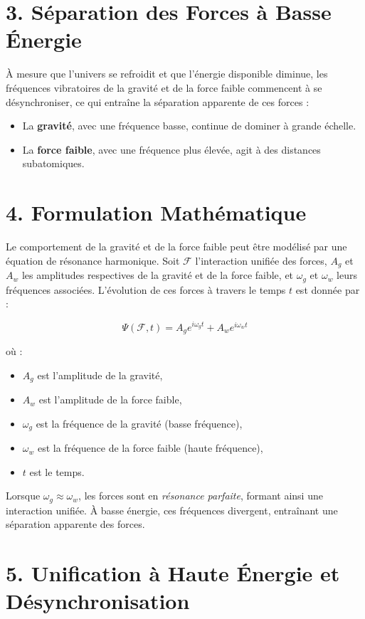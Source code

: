 \documentclass{article}
\begin{document}
\section{3. Séparation des Forces à Basse Énergie}

À mesure que l'univers se refroidit et que l'énergie disponible diminue, les fréquences vibratoires de la gravité et de la force faible commencent à se désynchroniser, ce qui entraîne la séparation apparente de ces forces :
\begin{itemize}
    \item La \textbf{gravité}, avec une fréquence basse, continue de dominer à grande échelle.
    \item La \textbf{force faible}, avec une fréquence plus élevée, agit à des distances subatomiques.
\end{itemize}

\section{4. Formulation Mathématique}

Le comportement de la gravité et de la force faible peut être modélisé par une équation de résonance harmonique. Soit \( \mathcal{F} \) l'interaction unifiée des forces, \( A_g \) et \( A_w \) les amplitudes respectives de la gravité et de la force faible, et \( \omega_g \) et \( \omega_w \) leurs fréquences associées. L'évolution de ces forces à travers le temps \( t \) est donnée par :

\[
\Psi(\mathcal{F}, t) = A_g e^{i\omega_g t} + A_w e^{i\omega_w t}
\]

où :
\begin{itemize}
    \item \( A_g \) est l'amplitude de la gravité,
    \item \( A_w \) est l'amplitude de la force faible,
    \item \( \omega_g \) est la fréquence de la gravité (basse fréquence),
    \item \( \omega_w \) est la fréquence de la force faible (haute fréquence),
    \item \( t \) est le temps.
\end{itemize}

Lorsque \( \omega_g \approx \omega_w \), les forces sont en \textit{résonance parfaite}, formant ainsi une interaction unifiée. À basse énergie, ces fréquences divergent, entraînant une séparation apparente des forces.

\section{5. Unification à Haute Énergie et Désynchronisation}
\end{document}
